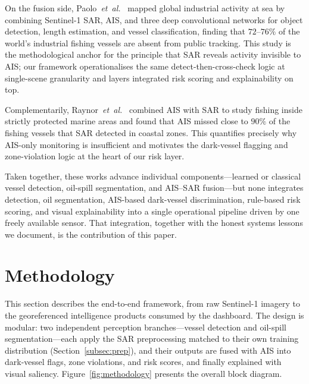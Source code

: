 \documentclass[a4paper,11pt]{article}
\begin{document}
On the fusion side, Paolo~\textit{et~al.}~\cite{paolo2024nature} mapped global
industrial activity at sea by combining Sentinel-1 SAR, AIS, and three deep
convolutional networks for object detection, length estimation, and vessel
classification, finding that $72$--$76\%$ of the world's industrial fishing vessels are
absent from public tracking. This study is the methodological anchor for the principle
that SAR reveals activity invisible to AIS; our framework operationalises the same
detect-then-cross-check logic at single-scene granularity and layers integrated risk
scoring and explainability on top.

Complementarily, Raynor~\textit{et~al.}~\cite{raynor2025science} combined AIS with SAR
to study fishing inside strictly protected marine areas and found that AIS missed close
to $90\%$ of the fishing vessels that SAR detected in coastal zones. This quantifies
precisely why AIS-only monitoring is insufficient and motivates the dark-vessel
flagging and zone-violation logic at the heart of our risk layer.

Taken together, these works advance individual components---learned or classical vessel
detection, oil-spill segmentation, and AIS--SAR fusion---but none integrates detection,
oil segmentation, AIS-based dark-vessel discrimination, rule-based risk scoring, and
visual explainability into a single operational pipeline driven by one freely available
sensor. That integration, together with the honest systems lessons we document, is the
contribution of this paper.

\section{Methodology}

This section describes the end-to-end framework, from raw Sentinel-1 imagery to the
georeferenced intelligence products consumed by the dashboard. The design is modular:
two independent perception branches---vessel detection and oil-spill
segmentation---each apply the SAR preprocessing matched to their own training
distribution (Section~\ref{subsec:prep}), and their outputs are fused with AIS into
dark-vessel flags, zone violations, and risk scores, and finally explained with visual
saliency. Figure~\ref{fig:methodology} presents the overall block diagram.
\end{document}
